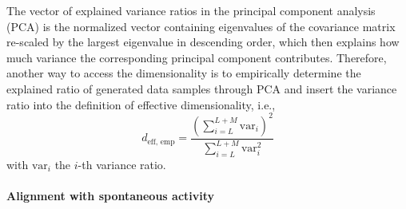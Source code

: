 \documentclass[11pt]{article}
\begin{document}
{	The vector of explained variance ratios in the principal component analysis (PCA) is the normalized vector containing eigenvalues of the covariance matrix re-scaled by the largest eigenvalue in descending order, which then explains how much variance the corresponding principal component contributes. Therefore, another way to access the dimensionality is to empirically determine the explained ratio of generated data samples through PCA and insert the variance ratio into the definition of effective dimensionality, i.e.,
		\begin{equation} \label{eq:dim_empirical_sym}
			d_{\text{eff, emp}} = \frac{\left(\sum_{i=L}^{L+M}\text{var}_i\right)^2}{\sum_{i=L}^{L+M}\text{var}_i^2} 
		\end{equation}
	with $\text{var}_i$ the $i$-th variance ratio. 
	
	\paragraph{Alignment with spontaneous activity}
	
}
\end{document}
